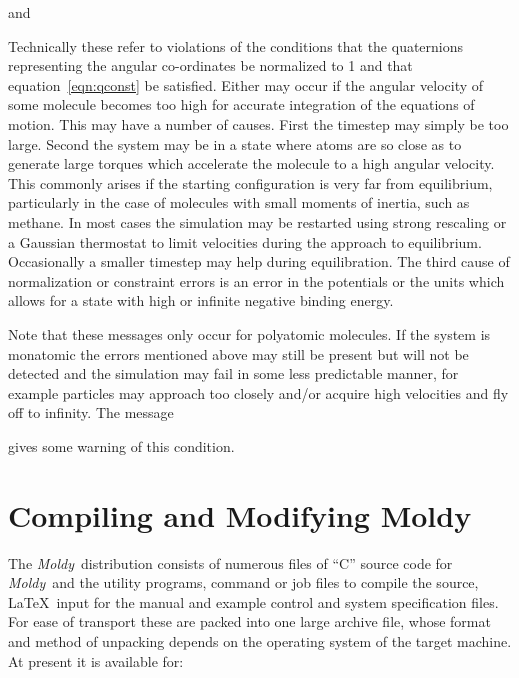 \documentclass[a4paper,twoside]{report}
\newcommand{\moldy}{\emph{Moldy}}
\begin{document}
and


\noindent
Technically these refer to violations of the conditions that the
quaternions representing the angular co-ordinates be normalized to 1
and that equation~\ref{eqn:qconst} be satisfied.  Either may occur if
the angular velocity of some molecule becomes too high for accurate
integration of the equations of motion. This may have a number of
causes.  First the timestep may simply be too large.  Second the
system may be in a state where atoms are so close as to generate large
torques which accelerate the molecule to a high angular velocity. This
commonly arises if the starting configuration is very far from
equilibrium, particularly in the case of molecules with small moments
of inertia, such as methane.  In most cases the simulation may be
restarted using strong rescaling or a Gaussian thermostat to limit
velocities during the approach to equilibrium.  Occasionally a smaller
timestep may help during equilibration.  The third cause of
normalization or constraint errors is an error in the potentials or
the units which allows for a state with high or infinite negative
binding energy.

Note that these messages only occur for polyatomic molecules.  If the
system is monatomic the errors mentioned above may still be present
but will not be detected and the simulation may fail in some less
predictable manner, for example particles may approach too closely
and/or acquire high velocities and fly off to infinity.  The message


\noindent
gives some warning of this condition.

\chapter{Compiling and Modifying Moldy} %

The \moldy\  distribution consists of numerous files of ``C'' source code
for \moldy\  and the utility programs, command or job files to compile
the source, \LaTeX\ input for the manual and example control and system
specification files.  For ease of transport these are packed into one
large archive file, whose format and method of unpacking depends
on the operating system of the target machine.  At present it is
available for:
\end{document}

